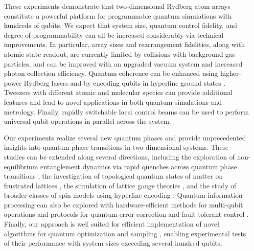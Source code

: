 \documentclass[reprint,twocolumn,secnumarabic,amssymb, aps, prl]{revtex4-1}
\begin{document}
These experiments demonstrate that two-dimensional Rydberg atom arrays constitute a powerful platform for programmable quantum simulations with hundreds of qubits. We expect that system size, quantum control fidelity, and degree of programmability can all be increased considerably via technical improvements. In particular, array sizes and rearrangement fidelities, along with atomic state readout, are currently limited by collisions with background gas particles, and can be improved with an upgraded vacuum system \cite{EndresEntanglement2020} and increased photon collection efficiency. Quantum coherence can be enhanced using higher-power Rydberg lasers and by encoding qubits in hyperfine ground states \cite{AtomArrayPRL2019, WhitlockRydbergReview2020}. Tweezers with different atomic \cite{ThompsonYb2019,EndresEntanglement2020,KaufmanClock2020} and molecular \cite{DoyleMoleculeTweezers2019, NiMoleculeTweezers2019} species can provide additional features and  lead to novel applications in both quantum simulations and metrology. 
Finally, rapidly switchable local control beams can be used to perform universal qubit operations in parallel across the system. 

Our experiments realize several new quantum phases and provide unprecedented insights into quantum phase transitions in two-dimensional systems. These studies can be extended along several directions, including the exploration of non-equilibrium entanglement dynamics via rapid quenches 
across quantum phase transitions \cite{Turner2018, DalmonteLatticeGaugeTheories2020, Scars2020}, the investigation of topological quantum states of matter on frustrated lattices \cite{samajdar2020quantum, verresen2020prediction}, the simulation of lattice gauge theories \cite{LatticeGaugeTheoryReview2020, MontangeroLGT2020}, and the study of broader classes of spin models using hyperfine encoding \cite{ZollerRydbergSimulator2010}. Quantum information processing can also be explored with hardware-efficient methods for multi-qubit operations \cite{AtomArrayPRL2019} and protocols for quantum error correction and fault tolerant control \cite{RydbergFaultTolerance2017}.
Finally, our approach is well suited for efficient implementation of novel algorithms for quantum optimization \cite{FarhiQAOA2014,LeoQAOA} and sampling \cite{ WildSampling2020}, enabling experimental tests of their performance with system sizes exceeding several hundred qubits. 


\end{document}
